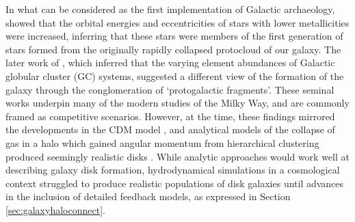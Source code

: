 In what can be considered as the first implementation of Galactic archaeology, \citet{1962ApJ...136..748E} showed that the orbital energies and eccentricities of stars with lower metallicities were increased, inferring that these stars were members of the first generation of stars formed from the originally rapidly collapsed protocloud of our galaxy. The later work of \citet{1978ApJ...225..357S}, which inferred that the varying element abundances of Galactic globular cluster (GC) systems, suggested a different view of the formation of the galaxy through the conglomeration of `protogalactic fragments'. These seminal works underpin many of the modern studies of the Milky Way, and are commonly framed as competitive scenarios. However, at the time, these findings mirrored the developments in the CDM model \citep{1978MNRAS.183..341W}, and analytical models of the collapse of gas in a halo which gained angular momentum from hierarchical clustering produced seemingly realistic disks \citep{1980MNRAS.193..189F}. While analytic approaches would work well at describing galaxy disk formation, hydrodynamical simulations in a cosmological context struggled to produce realistic populations of disk galaxies until advances in the inclusion of detailed feedback models, as expressed in Section \ref{sec:galaxyhaloconnect}. 






